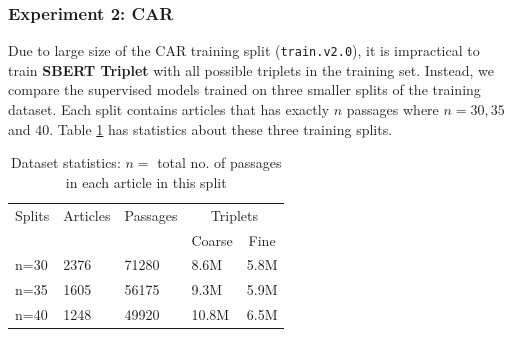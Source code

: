 \documentclass[11pt,a4paper]{article}
\begin{document}
\subsubsection{Experiment 2: CAR} Due to large size of the CAR training split (\texttt{train.v2.0}), it is impractical to train \textbf{SBERT Triplet} with all possible triplets in the training set. Instead, we compare the supervised models trained on three smaller splits of the training dataset. Each split contains articles that has exactly $n$ passages where $n=30, 35$ and $40$. Table \ref{tab:datsplit} has statistics about these three training splits. 

\begin{table}[h]
\caption{Dataset statistics: $n=$ total no. of passages in each article in this split}
\label{tab:datsplit}
\begin{tabular}{lllll}
\hline
\multicolumn{1}{c}{Splits} & \multicolumn{1}{c}{Articles} & \multicolumn{1}{c}{Passages} & \multicolumn{2}{c}{Triplets}                                  \\
\multicolumn{1}{c}{}       & \multicolumn{1}{c}{}         & \multicolumn{1}{c}{}         & \multicolumn{1}{c}{Coarse} & \multicolumn{1}{c}{Fine} \\ \hline
n=30 & 2376 & 71280 & 8.6M & 5.8M \\
n=35 & 1605 & 56175 & 9.3M & 5.9M \\
n=40 & 1248 & 49920 & 10.8M & 6.5M                                
\end{tabular}
\end{table}
\end{document}
